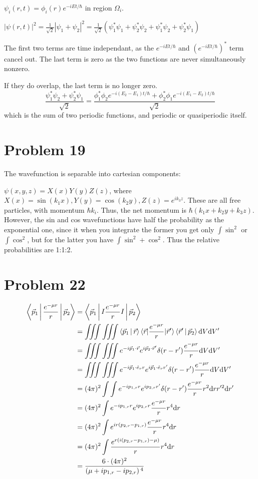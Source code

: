 \documentclass[12pt]{article}
\begin{document}
$\psi_i(r,t)=\phi_i(r)e^{-iEt/\hbar}$ in region $\Omega_i$.

$|\psi(r,t)|^2=\frac1{\sqrt{2}}|\psi_1+\psi_2|^2=\frac1{\sqrt{2}}\left(\psi_1^*\psi_1+\psi_2^*\psi_2+\psi_1^*\psi_2+\psi_2^*\psi_1\right)$

The first two terms are time independant, as the $e^{-iEt/\hbar}$ and $\left(e^{-iEt/\hbar}\right)^*$ term cancel out. The last term is zero as the two functions are never simultaneously nonzero.

If they do overlap, the last term is no longer zero. $$\frac{\psi_1^*\psi_2+\psi_2^*\psi_1}{\sqrt{2}}=\frac{\phi_1^*\phi_2 e^{-i(E_2-E_1)t/\hbar} + \phi_2^*\phi_1 e^{-i(E_1-E_2)t/\hbar}}{\sqrt{2}}$$ which is the sum of two periodic functions, and periodic or quasiperiodic itself.

\section*{Problem 19}

The wavefunction is separable into cartesian components:

$\psi(x,y,z)=X(x)Y(y)Z(z)$, where $X(x)=\sin(k_1 x), Y(y)=\cos(k_2 y), Z(z)=e^{ik_3z}$. These are all free particles, with momentum $\hbar k_i$. Thus, the net momentum is $\hbar\left(k_1x+k_2y+k_3z\right)$. However, the sin and cos wavefunctions have half the probability as the exponential one, since it when you integrate the former you get only $\int \sin^2$ or $\int \cos^2$, but for the latter you have $\int \sin^2+\cos^2$. Thus the relative probabilities are 1:1:2.

\section*{Problem 22}
\begin{align*}
\Braket{\vec p_1|\frac{e^{-\mu r}}{r}|\vec p_2} &= \Braket{\vec p_1|I\frac{e^{-\mu r}}{r}I|\vec p_2}\\
&=\iiint\iiint\Braket{\vec p_1|\vec r}\braket{\vec r|\frac{e^{-\mu r}}{r}|\vec r'}\Braket{\vec r'|\vec p_2} \mathrm d V \mathrm dV'\\
&= \iiint \iiint e^{-i\vec p_1\cdot\vec r}e^{i\vec p_2\cdot\vec r'}\delta(r-r')\frac{e^{-\mu r}}{r}\mathrm dV\mathrm dV'\\
&= \iiint \iiint e^{-i\vec p_1\cdot\hat e_r r}e^{i\vec p_1\cdot\hat e_r r'}\delta(r-r')\frac{e^{-\mu r}}{r}\mathrm dV\mathrm dV'\\
&= (4\pi)^2\int\int e^{-i p_{1,r}r}e^{i p_{2,r} r'}\delta(r-r')\frac{e^{-\mu r}}{r}r^2\mathrm drr'^2\mathrm dr'\\
&=(4\pi)^2 \int e^{-i p_{1,r} r}e^{ip_{2,r} r}\frac{e^{-\mu r}}{r}r^4\mathrm dr\\
&= (4\pi)^2\int e^{ir(p_{2,r}-p_{1,r})} \frac{e^{-\mu r}}{r} r^4\mathrm dr\\
&= (4\pi)^2\int \frac{e^{r(i(p_{2,r}-p_{1,r})-\mu)}}{r}r^4\mathrm dr\\
&= \frac{6\cdot (4\pi)^2}{\left(\mu +i p_{1,r}-i p_{2,r}\right){}^4}
\end{align*}
\end{document}
